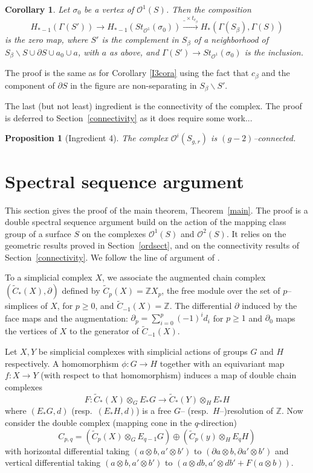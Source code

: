 \documentclass[10pt]{amsart}
\newtheorem{prop}[thm]{Proposition}
\newtheorem{cor}[thm]{Corollary}
\newcommand{\tC}{\tilde{C}}
\newcommand{\OO}{\mathcal{O}}
\newcommand{\Z}{\mathbb{Z}}
\newcommand{\be}{\beta}
\newcommand{\Ga}{\Gamma}
\newcommand{\s}{\sigma}
\newcommand{\rar}{\longrightarrow}
\newcommand{\minus}{\backslash}
\newcommand{\x}{\times}
\newcommand{\ot}{\otimes}
\newcommand{\del}{\partial}
\begin{document}
\begin{cor}\label{I3corb}
Let $\s_0$ be a vertex of $\OO^1(S)$. 
Then the composition 
$$ H_{*-1}(\Ga(S'))\rar H_{*-1}(St_{\OO^1}(\s_0))\xrightarrow{\_\x t_{c_\be}} H_*(\Ga(S_\be),\Ga(S))$$
is the zero map, where $S'$ is the complement in $S_\be$ of a neighborhood of
$S_\be\minus S\cup \del S\cup a_0\cup a$, with $a$ as above, and $\Ga(S')\to
St_{\OO^1}(\s_0)$ is the inclusion. 
 \end{cor}




The proof is the same as for Corollary \ref{I3cora} using the fact that $c_\be$ and the component of $\del
S$ in the figure are
non-separating in $S_\be\minus S'$. 


\medskip


The last (but not least) ingredient is the connectivity of the complex. The proof is deferred to Section~\ref{connectivity} as 
it does require some work...


\begin{prop}[Ingredient 4]\label{I4}
The complex $\OO^i(S_{g,r})$ is $(g-2)$--connected.
\end{prop}






\section{Spectral sequence argument}\label{SSsect}

This section gives the proof of the main theorem, Theorem~\ref{main}. The proof is a double spectral sequence argument build on the
action of the mapping class group of a surface $S$ on the complexes $\OO^1(S)$ and $\OO^2(S)$. It relies on the geometric results
proved in Section~\ref{ordsect}, and on the connectivity results of Section~\ref{connectivity}.  
We follow the line of argument of \cite{RW09}. 

\medskip

To a simplicial complex $X$, we associate the
augmented chain complex $(\tC_*(X),\del)$ 
defined by $\tC_p(X)=\Z X_p$, the free module over the set of $p$--simplices of $X$, for $p\ge 0$,
and $\tC_{-1}(X)=\Z$. The differential $\del$  induced by the face maps and the augmentation: 
$\del_p=\sum_{i=0}^p(-1)^id_i$ for $p\ge 1$ and $\del_0$ maps the vertices of $X$ to the generator of $\tC_{-1}(X)$.


Let $X,Y$ be simplicial complexes with simplicial actions of groups $G$ and $H$ respectively. 
A homomorphism $\phi\colon G\to H$ together with an equivariant map $f\colon X\to Y$ (with respect to that homomorphism) induces a map of double
chain complexes $$F\colon \tC_*(X)\ot_GE_*G \rar \tC_*(Y)\ot_H E_*H$$
where $(E_*G,d)$ (resp.~$(E_*H,d)$) is a free $G$-- (resp.~$H$--)resolution of $\Z$. 
Now consider the double complex (mapping cone in the $q$-direction)
$$C_{p,q}=(\tC_p(X)\ot_GE_{q-1}G)\oplus(\tC_p(y)\ot_H E_qH)$$
with horizontal differential taking $(a\ot b,a'\ot b')$ to $(\del a\ot b,\del a'\ot b')$ and vertical differential taking 
$(a\ot b,a'\ot b')$ to $(a\ot db,a'\ot db' + F(a\ot b))$. 
\end{document}
